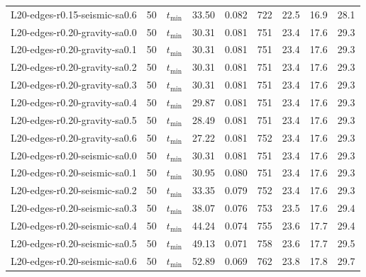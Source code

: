 \begin{tabular}{lrlrrrrrr}
L20-edges-r0.15-seismic-sa0.6 & 50 & $t_{\mathrm{min}}$ & 33.50 & 0.082 & 722 & 22.5 & 16.9 & 28.1 \\
L20-edges-r0.20-gravity-sa0.0 & 50 & $t_{\mathrm{min}}$ & 30.31 & 0.081 & 751 & 23.4 & 17.6 & 29.3 \\
L20-edges-r0.20-gravity-sa0.1 & 50 & $t_{\mathrm{min}}$ & 30.31 & 0.081 & 751 & 23.4 & 17.6 & 29.3 \\
L20-edges-r0.20-gravity-sa0.2 & 50 & $t_{\mathrm{min}}$ & 30.31 & 0.081 & 751 & 23.4 & 17.6 & 29.3 \\
L20-edges-r0.20-gravity-sa0.3 & 50 & $t_{\mathrm{min}}$ & 30.31 & 0.081 & 751 & 23.4 & 17.6 & 29.3 \\
L20-edges-r0.20-gravity-sa0.4 & 50 & $t_{\mathrm{min}}$ & 29.87 & 0.081 & 751 & 23.4 & 17.6 & 29.3 \\
L20-edges-r0.20-gravity-sa0.5 & 50 & $t_{\mathrm{min}}$ & 28.49 & 0.081 & 751 & 23.4 & 17.6 & 29.3 \\
L20-edges-r0.20-gravity-sa0.6 & 50 & $t_{\mathrm{min}}$ & 27.22 & 0.081 & 752 & 23.4 & 17.6 & 29.3 \\
L20-edges-r0.20-seismic-sa0.0 & 50 & $t_{\mathrm{min}}$ & 30.31 & 0.081 & 751 & 23.4 & 17.6 & 29.3 \\
L20-edges-r0.20-seismic-sa0.1 & 50 & $t_{\mathrm{min}}$ & 30.95 & 0.080 & 751 & 23.4 & 17.6 & 29.3 \\
L20-edges-r0.20-seismic-sa0.2 & 50 & $t_{\mathrm{min}}$ & 33.35 & 0.079 & 752 & 23.4 & 17.6 & 29.3 \\
L20-edges-r0.20-seismic-sa0.3 & 50 & $t_{\mathrm{min}}$ & 38.07 & 0.076 & 753 & 23.5 & 17.6 & 29.4 \\
L20-edges-r0.20-seismic-sa0.4 & 50 & $t_{\mathrm{min}}$ & 44.24 & 0.074 & 755 & 23.6 & 17.7 & 29.4 \\
L20-edges-r0.20-seismic-sa0.5 & 50 & $t_{\mathrm{min}}$ & 49.13 & 0.071 & 758 & 23.6 & 17.7 & 29.5 \\
L20-edges-r0.20-seismic-sa0.6 & 50 & $t_{\mathrm{min}}$ & 52.89 & 0.069 & 762 & 23.8 & 17.8 & 29.7 \\
\bottomrule
\end{tabular}
